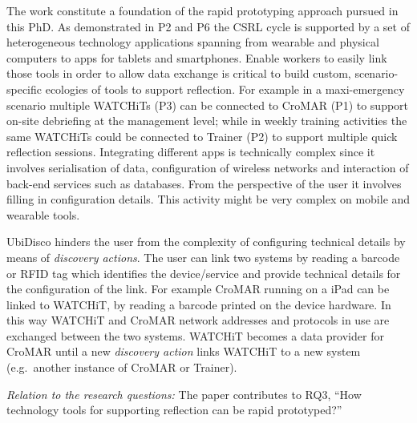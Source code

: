 The work constitute a foundation of the rapid prototyping approach pursued in this PhD. As demonstrated in P2 and P6 the CSRL cycle is supported by a set of heterogeneous technology applications spanning from wearable and physical computers to apps for tablets and smartphones. Enable workers to easily link those tools in order to allow data exchange is critical to build custom, scenario-specific ecologies of tools to support reflection. For example in a maxi-emergency scenario multiple WATCHiTs (P3) can be connected to CroMAR (P1) to support on-site debriefing at the management level; while in weekly training activities the same WATCHiTs could be connected to Trainer (P2) to support multiple quick reflection sessions. Integrating different apps is technically complex since it involves serialisation of data, configuration of wireless networks and interaction of back-end services such as databases. From the perspective of the user it involves filling in configuration details. This activity might be very complex on mobile and wearable tools.

UbiDisco hinders the user from the complexity of configuring technical details by means of \emph{discovery actions}. The user can link two systems by reading a barcode or RFID tag which identifies the device/service and provide technical details for the configuration of the link. For example CroMAR running on a iPad can be linked to WATCHiT, by reading a barcode printed on the device hardware. In this way WATCHiT and CroMAR network addresses and protocols in use are exchanged between the two systems. WATCHiT becomes a data provider for CroMAR until a new \emph{discovery action} links WATCHiT to a new system (e.g.~another instance of CroMAR or Trainer).

\emph{Relation to the research questions: } The paper contributes to RQ3, ``How technology tools for supporting reflection can be rapid prototyped?'' 
